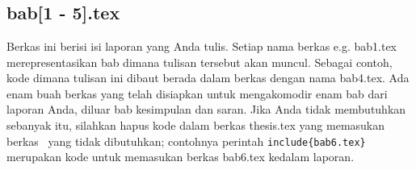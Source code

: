 \chapter{\babEmpat}




\section{bab[1 - 5].tex}
Berkas ini berisi isi laporan yang Anda tulis. 
Setiap nama berkas e.g. bab1.tex merepresentasikan bab dimana tulisan tersebut 
akan muncul. 
Sebagai contoh, kode dimana tulisan ini dibaut berada dalam berkas dengan nama 
bab4.tex. 
Ada enam buah berkas yang telah disiapkan untuk mengakomodir enam bab dari 
laporan Anda, diluar bab kesimpulan dan saran. 
Jika Anda tidak membutuhkan sebanyak itu, silahkan hapus kode dalam berkas 
thesis.tex yang memasukan berkas \latex~yang tidak dibutuhkan;  contohnya 
perintah \texttt{\bslash include\{bab6.tex\}} merupakan kode untuk memasukan berkas 
bab6.tex kedalam laporan.

